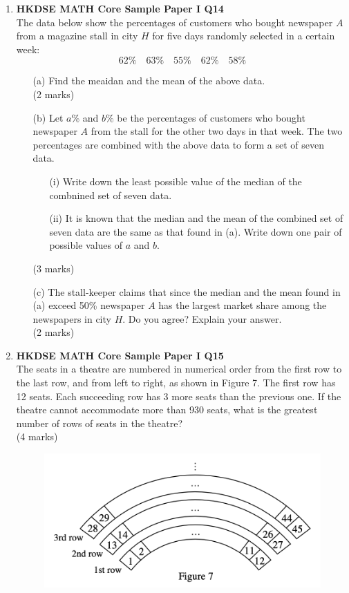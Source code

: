 \documentclass[12pt]{article}
\begin{document}
\begin{enumerate}
	\item \textbf{HKDSE MATH Core Sample Paper I Q14}\\
	The data below show the percentages of customers who bought newspaper $A$ from a magazine stall in city $H$ for five days randomly selected in a certain week:
	$$62\% \quad 63\% \quad 55\% \quad 62\% \quad 58\%$$
	\begin{enumerate}
		\item[(a)] Find the meaidan and the mean of the above data. \\(2 marks)
		\item[(b)] Let $a\%$ and $b\%$ be the percentages of customers who bought newspaper $A$ from the stall for the other two days in that week. The two percentages are combined with the above data to form a set of seven data.
		\begin{enumerate}
			\item[(i)] Write down the least possible value of the median of the combnined set of seven data.
			\item[(ii)] It is known that the median and the mean of the combined set of seven data are the same as that found in (a). Write down one pair of possible values of $a$ and $b$.
		\end{enumerate}
		(3 marks)
		\item[(c)] The stall-keeper claims that since the median and the mean found in (a) exceed 50\% newspaper $A$ has the largest market share among the newspapers in city $H$. Do you agree? Explain your answer. \\(2 marks) 
	\end{enumerate}

	\item \textbf{HKDSE MATH Core Sample Paper I Q15}\\
	The seats in a theatre are numbered in numerical order from the first row to the last row, and from left to right, as shown in Figure 7. The first row has 12 seats. Each succeeding row has 3 more seats than the previous one. If the theatre cannot accommodate more than 930 seats, what is the greatest number of rows of seats in the theatre? \\(4 marks)
	\begin{figure}[H]
		\centering
		\includegraphics[width = .5\linewidth]{SPFigure1.7}
	\end{figure}


\end{enumerate}
\end{document}
